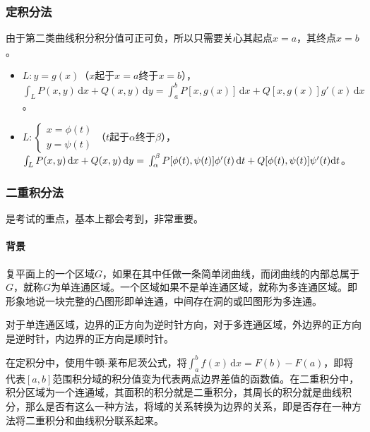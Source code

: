 \documentclass[UTF8, 12pt]{ctexart}
\begin{document}
        \subsubsection{定积分法}

        由于第二类曲线积分积分值可正可负，所以只需要关心其起点$x=a$，其终点$x=b$。

        \begin{itemize}
            \item $L:y=g(x)$（$x$起于$x=a$终于$x=b$），$\int_LP(x,y)\,\textrm{d}x+Q(x,y)\,\textrm{d}y=\int_a^bP[x,g(x)]\,\textrm{d}x+Q[x,g(x)]g'(x)\,\textrm{d}x$。
            \item $L:\left\{\begin{array}{c}
                                x=\phi(t) \\
                                y=\psi(t)
            \end{array}\right.$（$t$起于$\alpha$终于$\beta$），$\int_LP(x,y)\,\textrm{d}x+Q(x,y)\,\textrm{d}y=\\\int_\alpha^\beta P[\phi(t),\psi(t)]\phi'(t)\,\textrm{d}t+Q[\phi(t),\psi(t)]\psi'(t)\textrm{d}t$。
        \end{itemize}

        \subsubsection{二重积分法}

        是考试的重点，基本上都会考到，非常重要。

        \paragraph{背景} \leavevmode \medskip

        复平面上的一个区域$G$，如果在其中任做一条简单闭曲线，而闭曲线的内部总属于$G$，就称$G$为单连通区域。一个区域如果不是单连通区域，就称为多连通区域。即形象地说一块完整的凸图形即单连通，中间存在洞的或凹图形为多连通。

        对于单连通区域，边界的正方向为逆时针方向，对于多连通区域，外边界的正方向是逆时针，内边界的正方向是顺时针。

        在定积分中，使用牛顿-莱布尼茨公式，将$\int_a^bf(x)\,\textrm{d}x=F(b)-F(a)$，即将代表$[a,b]$范围积分域的积分值变为代表两点边界差值的函数值。在二重积分中，积分区域为一个连通域，其面积的积分就是二重积分，其周长的积分就是曲线积分，那么是否有这么一种方法，将域的关系转换为边界的关系，即是否存在一种方法将二重积分和曲线积分联系起来。
\end{document}
